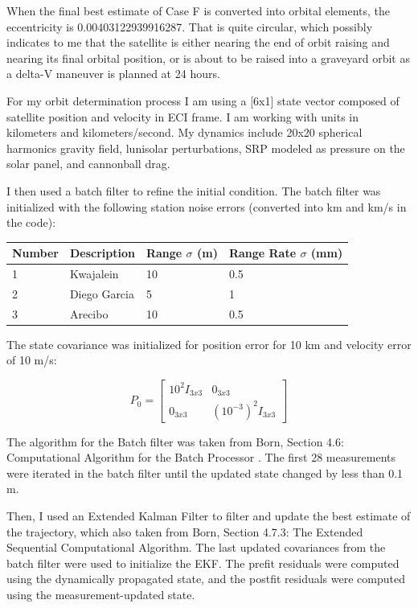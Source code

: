\documentclass[conf]{new-aiaa}
\begin{document}
When the final best estimate of Case F is converted into orbital elements, the eccentricity is 0.00403122939916287. That is quite circular, which possibly indicates to me that the satellite is either nearing the end of orbit raising and nearing its final orbital position, or is about to be raised into a graveyard orbit as a delta-V maneuver is planned at 24 hours. 

For my orbit determination process I am using a [6x1] state vector composed of satellite position and velocity in ECI frame. I am working with units in kilometers and kilometers/second. My dynamics include 20x20 spherical harmonics gravity field, lunisolar perturbations, SRP modeled as pressure on the solar panel, and cannonball drag. 

I then used a batch filter to refine the initial condition. The batch filter was initialized with the following station noise errors (converted into km and km/s in the code):

\begin{table}[H]
	\begin{center}
		\begin{tabular}{|l|l|l|l|}
			\hline 
			Number & Description & Range $\sigma$ (m) & Range Rate $\sigma$ (mm) \\ \hline 
			1 & Kwajalein & 10 & 0.5 \\ \hline 
			2 & Diego Garcia & 5 & 1 \\ \hline 
			3 & Arecibo & 10 & 0.5 \\ \hline 
		\end{tabular}
	\end{center}
\end{table} 

The state covariance was initialized for position error for 10 km and velocity error of 10 m/s: 

\begin{equation*}
	P_0 = 
	\begin{bmatrix}
		10^2I_{3x3} & 0_{3x3} \\
		0_{3x3} & (10^{-3})^2I_{3x3} 
	\end{bmatrix}
\end{equation*}

The algorithm for the Batch filter was taken from Born, Section 4.6: Computational Algorithm for the Batch Processor \cite{born_statorbitdet}. The first 28 measurements were iterated in the batch filter until the updated state changed by less than 0.1 m. 

Then, I used an Extended Kalman Filter to filter and update the best estimate of the trajectory, which also taken from Born, Section 4.7.3: The Extended Sequential Computational Algorithm. The last updated covariances from the batch filter were used to initialize the EKF. The prefit residuals were computed using the dynamically propagated state, and the postfit residuals were computed using the measurement-updated state. 
\end{document}

